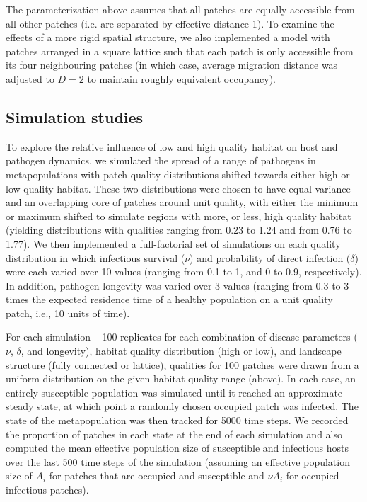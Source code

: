 \documentclass{article}
\begin{document}
The parameterization above assumes that all patches are equally accessible from all other patches (i.e. are separated by effective distance 1).  To examine the effects of a more rigid spatial structure, we also implemented a model with patches arranged in a square lattice such that each patch is only accessible from its four neighbouring patches (in which case, average migration distance was adjusted to $D = 2$ to maintain roughly equivalent occupancy).  

\subsection{Simulation studies}

To explore the relative influence of low and high quality habitat on host and pathogen dynamics, we simulated the spread of a range of pathogens in metapopulations with patch quality distributions shifted towards either high or low quality habitat.
These two distributions were chosen to have equal variance and an overlapping core of patches around unit quality, with either the minimum or maximum shifted to simulate regions with more, or less, high quality habitat (yielding distributions with qualities ranging from 0.23 to 1.24 and from 0.76 to 1.77).  
We then implemented a full-factorial set of simulations on each quality distribution in which infectious survival ($\nu$) and probability of direct infection ($\delta$) were each varied over 10 values (ranging from 0.1 to 1, and 0 to 0.9, respectively).  In addition, pathogen longevity was varied over 3 values (ranging from 0.3 to 3 times the expected residence time of a healthy population on a unit quality patch, i.e., 10 units of time).

For each simulation -- 100 replicates for each combination of disease parameters ($\nu$, $\delta$, and longevity), habitat quality distribution (high or low), and landscape structure (fully connected or lattice), qualities for 100 patches were drawn from a uniform distribution on the given habitat quality range (above). In each case, an entirely susceptible population was simulated until it reached an approximate steady state, at which point a randomly chosen occupied patch was infected.  The state of the metapopulation was then tracked for 5000 time steps.  We recorded the proportion of patches in each state at the end of each simulation and also computed the mean effective population size of susceptible and infectious hosts over the last 500 time steps of the simulation (assuming an effective population size of $A_i$ for patches that are occupied and susceptible and $\nu A_i$ for occupied infectious patches).    
\end{document}

